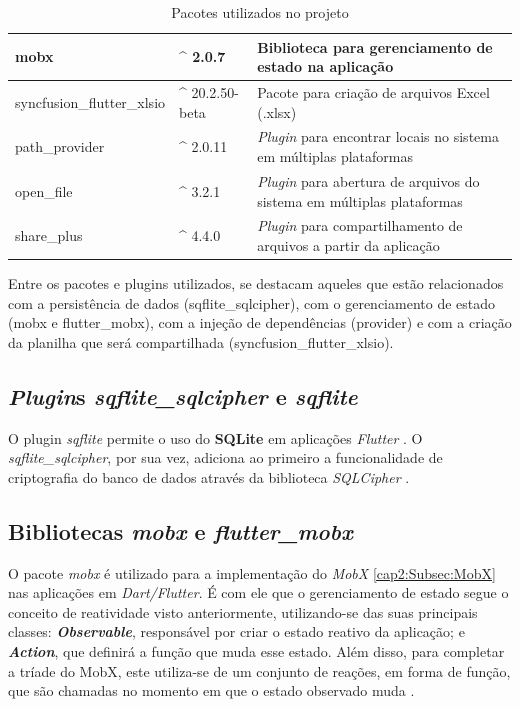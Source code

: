 \begin{table}[]
\begin{tabular}{|>{\raggedright\arraybackslash}m{}|m{}|m{}|}
    mobx                       & \^{} 2.0.7        & Biblioteca para gerenciamento de estado na aplicação                                           \\ \hline
    syncfusion\_flutter\_xlsio & \^{} 20.2.50-beta & Pacote para criação de arquivos Excel (.xlsx) \cite{syncfusion_flutter_xlsio-package}          \\ \hline
    path\_provider             & \^{} 2.0.11       & \textit{Plugin} para encontrar locais no sistema em múltiplas plataformas \cite{path_provider-package}  \\ \hline
    open\_file                 & \^{} 3.2.1        & \textit{Plugin} para abertura de arquivos do sistema em múltiplas plataformas \cite{open_file-package} \\ \hline
    share\_plus               & \^{} 4.4.0        & \textit{Plugin} para compartilhamento de arquivos a partir da aplicação \cite{share_plus-package}       \\ \hline
  \end{tabular}
  \caption{Pacotes utilizados no projeto}
  \label{tab:packages}
\end{table}


Entre os pacotes e plugins utilizados, se destacam aqueles que estão relacionados com a persistência de dados (sqflite\_sqlcipher), com o gerenciamento de estado (mobx e flutter\_mobx), com a injeção de dependências (provider) e com a criação da planilha que será compartilhada (syncfusion\_flutter\_xlsio).

\subsection{\textit{Plugin}s \textit{sqflite\_sqlcipher} e \textit{sqflite}}
\label{cap4:Subsec:sqflite-sqlcipher-package}
O plugin \textit{sqflite} permite o uso do \textbf{SQLite} em aplicações \textit{Flutter} \cite{sqflite-package}. O \textit{sqflite\_sqlcipher}, por sua vez, adiciona ao primeiro a funcionalidade de criptografia do banco de dados através da biblioteca \textit{SQLCipher} \cite{sqlcipher-package}.

\subsection{Bibliotecas \textit{mobx} e \textit{flutter\_mobx}}
\label{cap4:Subsec:mobx-package}
O pacote \textit{mobx} é utilizado para a implementação do \textit{MobX} \ref{cap2:Subsec:MobX} nas aplicações em \textit{Dart/Flutter}. É com ele que o gerenciamento de estado segue o conceito de reatividade visto anteriormente, utilizando-se das suas principais classes: \textit{\textbf{Observable}}, responsável por criar o estado reativo da aplicação; e \textit{\textbf{Action}}, que definirá a função que muda esse estado. Além disso, para completar a tríade do MobX, este utiliza-se de um conjunto de reações, em forma de função, que são chamadas no momento em que o estado observado muda \cite{mobx-package}.

